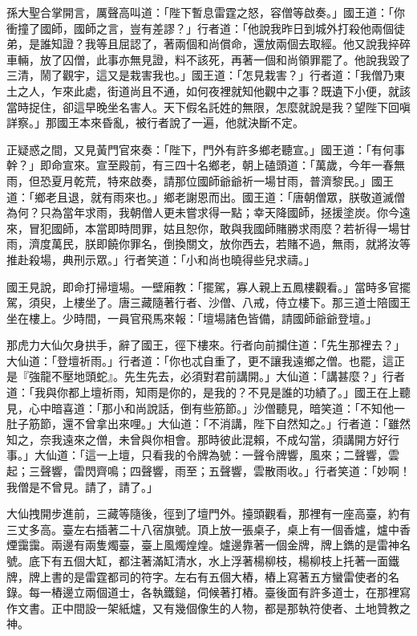 孫大聖合掌開言，厲聲高叫道：「陛下暫息雷霆之怒，容僧等啟奏。」國王道：「你衝撞了國師，國師之言，豈有差謬？」行者道：「他說我昨日到城外打殺他兩個徒弟，是誰知證？我等且屈認了，著兩個和尚償命，還放兩個去取經。他又說我捽碎車輛，放了囚僧，此事亦無見證，料不該死，再著一個和尚領罪罷了。他說我毀了三清，鬧了觀宇，這又是栽害我也。」國王道：「怎見栽害？」行者道：「我僧乃東土之人，乍來此處，街道尚且不通，如何夜裡就知他觀中之事？既遺下小便，就該當時捉住，卻這早晚坐名害人。天下假名託姓的無限，怎麼就說是我？望陛下回嗔詳察。」那國王本來昏亂，被行者說了一遍，他就決斷不定。

正疑惑之間，又見黃門官來奏：「陛下，門外有許多鄉老聽宣。」國王道：「有何事幹？」即命宣來。宣至殿前，有三四十名鄉老，朝上磕頭道：「萬歲，今年一春無雨，但恐夏月乾荒，特來啟奏，請那位國師爺爺祈一場甘雨，普濟黎民。」國王道：「鄉老且退，就有雨來也。」鄉老謝恩而出。國王道：「唐朝僧眾，朕敬道滅僧為何？只為當年求雨，我朝僧人更未嘗求得一點；幸天降國師，拯援塗炭。你今遠來，冒犯國師，本當即時問罪，姑且恕你，敢與我國師賭勝求雨麼？若祈得一場甘雨，濟度萬民，朕即饒你罪名，倒換關文，放你西去，若賭不過，無雨，就將汝等推赴殺場，典刑示眾。」行者笑道：「小和尚也曉得些兒求禱。」

國王見說，即命打掃壇場。一壁廂教：「擺駕，寡人親上五鳳樓觀看。」當時多官擺駕，須臾，上樓坐了。唐三藏隨著行者、沙僧、八戒，侍立樓下。那三道士陪國王坐在樓上。少時間，一員官飛馬來報：「壇場諸色皆備，請國師爺爺登壇。」

那虎力大仙欠身拱手，辭了國王，徑下樓來。行者向前攔住道：「先生那裡去？」大仙道：「登壇祈雨。」行者道：「你也忒自重了，更不讓我遠鄉之僧。也罷，這正是『強龍不壓地頭蛇』。先生先去，必須對君前講開。」大仙道：「講甚麼？」行者道：「我與你都上壇祈雨，知雨是你的，是我的？不見是誰的功績了。」國王在上聽見，心中暗喜道：「那小和尚說話，倒有些筋節。」沙僧聽見，暗笑道：「不知他一肚子筋節，還不曾拿出來哩。」大仙道：「不消講，陛下自然知之。」行者道：「雖然知之，奈我遠來之僧，未曾與你相會。那時彼此混賴，不成勾當，須講開方好行事。」大仙道：「這一上壇，只看我的令牌為號：一聲令牌響，風來；二聲響，雲起；三聲響，雷閃齊鳴；四聲響，雨至；五聲響，雲散雨收。」行者笑道：「妙啊！我僧是不曾見。請了，請了。」

大仙拽開步進前，三藏等隨後，徑到了壇門外。擡頭觀看，那裡有一座高臺，約有三丈多高。臺左右插著二十八宿旗號。頂上放一張桌子，桌上有一個香爐，爐中香煙靄靄。兩邊有兩隻燭臺，臺上風燭煌煌。爐邊靠著一個金牌，牌上鐫的是雷神名號。底下有五個大缸，都注著滿缸清水，水上浮著楊柳枝，楊柳枝上托著一面鐵牌，牌上書的是雷霆都司的符字。左右有五個大樁，樁上寫著五方蠻雷使者的名錄。每一樁邊立兩個道士，各執鐵鎚，伺候著打樁。臺後面有許多道士，在那裡寫作文書。正中間設一架紙爐，又有幾個像生的人物，都是那執符使者、土地贊教之神。

